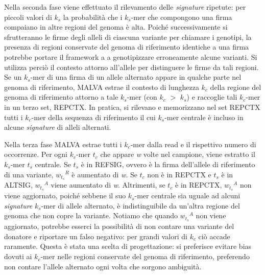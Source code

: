 \documentclass[../main.tex]{subfiles}
\begin{document}
Nella seconda fase viene effettuato il rilevamento delle \textit{signature} ripetute: per piccoli valori di  \textit{${k}_{s}$} la probabilità che i  \textit{${k}_{s}$}-mer che compongono una firma compaiano in altre regioni del genoma è alta. Poiché successivamente si sfrutteranno le firme degli alleli di ciascuna variante per chiamare i genotipi, la presenza di regioni conservate del genoma di riferimento identiche a una firma potrebbe portare il framework a a genotipizzare erroneamente alcune varianti. Si utilizza perciò il contesto attorno all'allele per distinguere le firme da tali regioni. Se un  \textit{${k}_{s}$}-mer di una firma di un allele alternato appare in qualche parte nel genoma di riferimento, MALVA estrae il contesto di lunghezza  \textit{${k}_{c}$} della regione del genoma di riferimento attorno a tale  \textit{${k}_{s}$}-mer (con  \textit{${k}_{c}$} $>$  \textit{${k}_{s}$}) e raccoglie tali  \textit{${k}_{c}$}-mer in un terzo set, REPCTX. In pratica, si rilevano e memorizzano nel set REPCTX  tutti i  \textit{${k}_{c}$}-mer della sequenza di riferimento il cui \textit{${k}_{s}$}-mer centrale è incluso in alcune \textit{signature} di alleli alternati. 

Nella terza fase MALVA estrae tutti i  \textit{${k}_{c}$}-mer dalla read e il rispettivo numero di occorrenze. Per ogni  \textit{${k}_{c}$}-mer  \textit{${t}_{c}$} che appare \textit{w} volte nel campione, viene estratto il  \textit{${k}_{s}$}-mer  \textit{${t}_{s}$} centrale. Se  \textit{${t}_{s}$} è in REFSIG, ovvero è la firma dell'allele di riferimento di una variante, \textit{${w_{{t}_{s}}}^{R}$} è aumentato di \textit{w}. Se  \textit{${t}_{c}$} non è in REPCTX e  \textit{${t}_{s}$} è in ALTSIG, \textit{${w_{{t}_{s}}}^{A}$} viene aumentato di \textit{w}. Altrimenti, se  \textit{${t}_{c}$} è in REPCTX, \textit{${w_{{t}_{s}}}^{A}$} non viene aggiornato, poiché sebbene il suo \textit{${k}_{s}$}-mer centrale sia uguale ad alcuni \textit{signature}  \textit{${k}_{s}$}-mer di allele alternato, è indistinguibile da un'altra regione del genoma che non copre la variante. Notiamo che quando \textit{${w_{{t}_{s}}}^{A}$} non viene aggiornato, potrebbe esserci la possibilità di non contare una variante del donatore e riportare un falso negativo: per grandi valori di  \textit{${k}_{c}$} ciò accade raramente. Questa è stata una scelta di progettazione: si preferisce evitare bias dovuti ai  \textit{${k}_{c}$}-mer nelle regioni conservate del genoma di riferimento, preferendo non contare l'allele alternato ogni volta che sorgono ambiguità.
\end{document}
